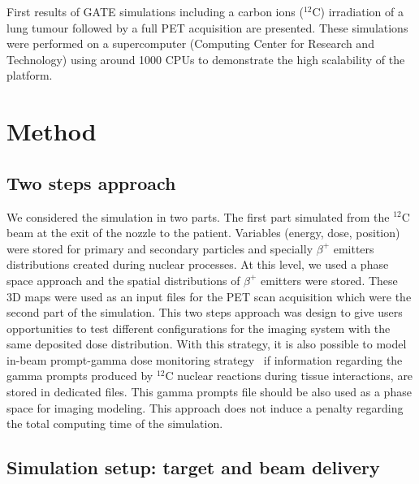 \documentclass[11pt]{iopart}
\begin{document}
First results of GATE simulations including a carbon ions ($^{12}$C)
irradiation of a lung tumour followed by a full PET acquisition are
presented. These simulations were performed on a supercomputer
(Computing Center for Research and Technology) using around 1000 CPUs
to demonstrate the high scalability of the platform.

\section{Method}



\subsection{Two steps approach}

We considered the simulation in two parts. The first part simulated
from the $^{12}$C beam at the exit of the nozzle to the
patient. Variables (energy, dose, position) were stored for primary
and secondary particles and specially $\beta^+$ emitters distributions
created during nuclear processes. At this level, we used a phase space
approach and the spatial distributions of $\beta^+$ emitters were
stored. These 3D maps were used as an input files for the PET scan
acquisition which were the second part of the simulation. This two
steps approach was design to give users opportunities to test
different configurations for the imaging system with the same
deposited dose distribution. With this strategy, it is also possible
to model in-beam prompt-gamma dose monitoring
strategy~\cite{Testa2008, Moteabbed2011} if information regarding the
gamma prompts produced by $^{12}$C nuclear reactions during tissue
interactions, are stored in dedicated files. This gamma prompts file
should be also used as a phase space for imaging modeling. This
approach does not induce a penalty regarding the total computing time
of the simulation.


\subsection{Simulation setup: target and beam delivery}
\end{document}
